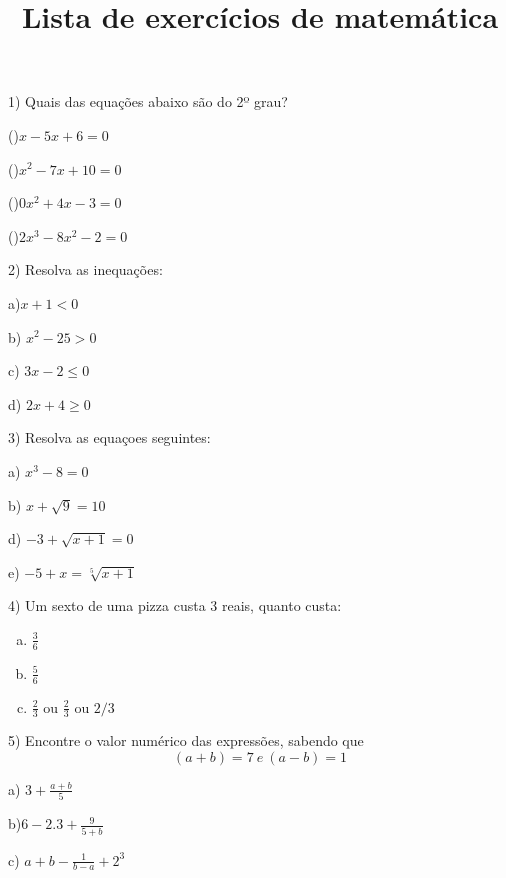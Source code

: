 \documentclass[12pt]{memoir}
\begin{document}
\title{Lista de exercícios de matemática }
\maketitle	

1) Quais das equações abaixo são do 2º grau?\par


()\(x - 5x + 6 = 0\)\par   


             
()\(x^2 - 7x + 10 = 0\)\par
()\(0x^2 + 4x - 3 = 0\)\par
 ()\(2x^3 - 8x^2 - 2 = 0\)\par
 
 	
	2) Resolva as inequações:\par
	a)\(x + 1 < 0\)\par
	b) \(x^2 - 25 >0\)\par
	c) \(3x - 2 \leq 0\)\par
	d) \(2x + 4 \geq 0\)\par
	
	3) Resolva as equaçoes seguintes:\par
	
	a) \(x^3 - 8 = 0\)\par
	b) \(x + \sqrt9 = 10\)\par
	d) \(-3 + \sqrt{x + 1} = 0\)\par	
	e) \(-5 +x = \sqrt[5]{x+1}\)\par
	
	4) Um sexto de uma pizza custa 3 reais, quanto custa:\par
	\begin{enumerate}[a)]
	\item \(\frac{3}{6}\)
		
	\item \(\frac{5}{6}\)
	
	\item \(\frac{2}{3}\) ou \(\displaystyle\frac{2}{3}\)	 ou \(2/3\)
	\end{enumerate}
	
	5) Encontre o valor numérico das expressões, sabendo que \[(a + b) = 7\ e\ (a - b) = 1\]\par
	
	a) \(3+\frac{a+b}{5}\) \par
	b)\(6 - 2.3 +\frac{9}{5 + b}\)\par
	c) \(a + b - \frac{1}{b-a} + 2^3\)\par
	
\end{document}
